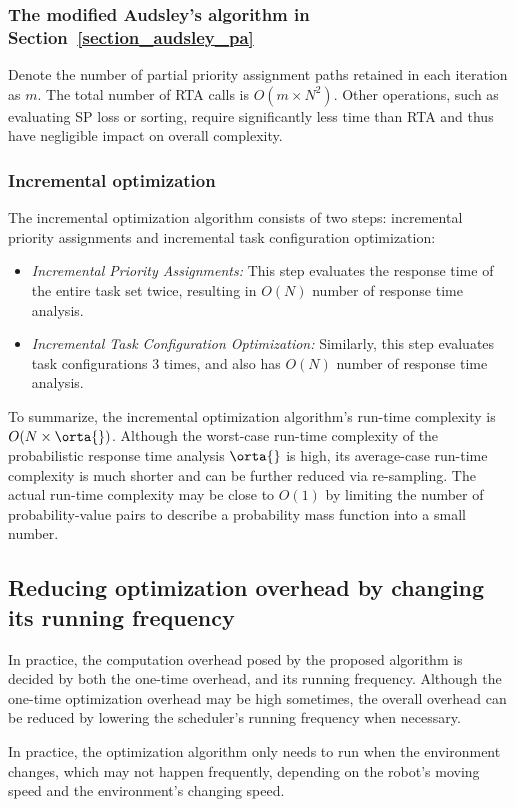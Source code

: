 \subsubsection{The modified Audsley's algorithm in Section~\ref{section_audsley_pa}}
Denote the number of partial priority assignment paths retained in each iteration as $m$. The total number of RTA calls is $O(m \times N^2)$. Other operations, such as evaluating SP loss or sorting, require significantly less time than RTA and thus have negligible impact on overall complexity.

\subsubsection{Incremental optimization}	
The incremental optimization algorithm consists of two steps: incremental priority assignments and incremental task configuration optimization: \begin{itemize}
    \item \textit{Incremental Priority Assignments:} This step evaluates the response time of the entire task set twice, resulting in $O(N)$ number of response time analysis. 
    \item \textit{Incremental Task Configuration Optimization:} Similarly, this step evaluates task configurations 3 times, and also has $O(N)$ number of response time analysis.
\end{itemize}
To summarize, the incremental optimization algorithm's run-time complexity is $O(N \times \orta{} )$. Although the worst-case run-time complexity of the probabilistic response time analysis $\orta{}$ is high, its average-case run-time complexity is much shorter and can be further reduced via re-sampling. The actual run-time complexity may be close to $O(1)$ by limiting the number of probability-value pairs to describe a probability mass function into a small number.

\subsection{Reducing optimization overhead by changing its running frequency}
In practice, the computation overhead posed by the proposed algorithm is decided by both the one-time overhead, and its running frequency.
Although the one-time optimization overhead may be high sometimes, the overall overhead can be reduced by lowering the scheduler's running frequency when necessary.

In practice, the optimization algorithm only needs to run when the environment changes, which may not happen frequently, depending on the robot's moving speed and the environment's changing speed. 


	
	
	
	


